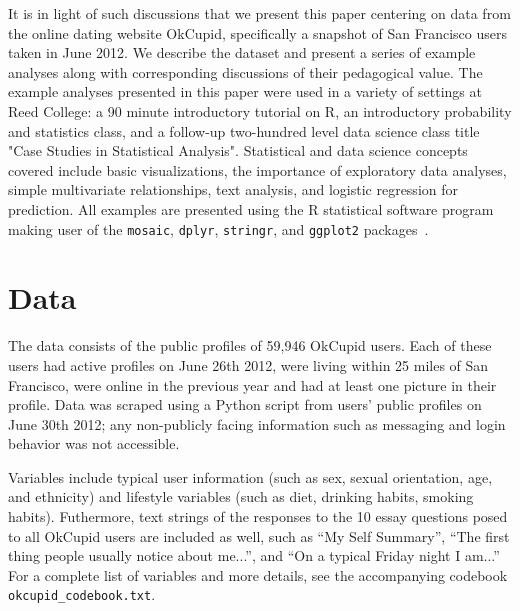 \documentclass{article}\usepackage[]{graphicx}\usepackage[]{color}
\begin{document}
It is in light of such discussions that we present this paper centering on data from the online dating website OkCupid, specifically a snapshot of San Francisco users taken in June 2012.  We describe the dataset and present a series of example analyses along with corresponding discussions of their pedagogical value.  The example analyses presented in this paper were used in a variety of settings at Reed College: a 90 minute introductory tutorial on R, an introductory probability and statistics class, and a follow-up two-hundred level data science class title "Case Studies in Statistical Analysis".  Statistical and data science concepts covered include basic visualizations, the importance of exploratory data analyses, simple multivariate relationships, text analysis, and logistic regression for prediction.  All examples are presented using the R statistical software program making user of the \verb#mosaic#, \verb#dplyr#, \verb#stringr#, and \verb#ggplot2# packages~\cite{mosaic, dplyr, stringr, ggplot2}.








%
\section{Data}
%
The data consists of the public profiles of 59,946 OkCupid users. Each of these users had active profiles on June 26th 2012, were living within 25 miles of San Francisco, were online in the previous year and had at least one picture in their profile. Data was scraped using a Python script from users' public profiles on June 30th 2012; any non-publicly facing information such as messaging and login behavior was not accessible.

Variables include typical user information (such as sex, sexual orientation, age, and ethnicity) and lifestyle variables (such as diet, drinking habits, smoking habits).  Futhermore, text strings of the responses to the 10 essay questions posed to all OkCupid users are included as well, such as ``My Self Summary'', ``The first thing people usually notice about me...'', and ``On a typical Friday night I am...''  For a complete list of variables and more details, see the accompanying codebook \verb#okcupid_codebook.txt#.
\end{document}
